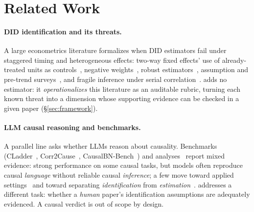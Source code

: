 \section{Related Work}
\label{sec:related}

\paragraph{DID identification and its threats.}
A large econometrics literature formalizes when DID estimators fail under
staggered timing and heterogeneous effects: two-way fixed effects' use of
already-treated units as controls~\cite{goodmanbacon2021}, negative
weights~\cite{dechaisemartin2020}, robust
estimators~\cite{callaway2021,sunabraham2021}, assumption and pre-trend
surveys~\cite{roth2023}, and fragile inference under serial
correlation~\cite{bertrand2004trust}. \sys{} adds no estimator: it
\emph{operationalizes} this literature as an auditable rubric, turning each
known threat into a dimension whose supporting evidence can be checked in a
given paper (\S\ref{sec:framework}).

\paragraph{LLM causal reasoning and benchmarks.}
A parallel line asks whether LLMs reason about causality. Benchmarks
(CLadder~\cite{jin2023cladder}, Corr2Cause~\cite{jin2024corr2cause},
CausalBN-Bench~\cite{zhou2024causalbench}) and
analyses~\cite{kiciman2023causal,yang2024criticalreview,zecevic2023causalparrots}
report mixed evidence: strong performance on some causal tasks, but models
often reproduce causal \emph{language} without reliable causal
\emph{inference}; a few move toward applied settings~\cite{lee2025econcausal} and toward
separating \emph{identification} from
\emph{estimation}~\cite{sawarni2026causalreasoning}. \sys{}
addresses a different task: whether a \emph{human} paper's identification
assumptions are adequately evidenced. A causal verdict is out of scope by design.

